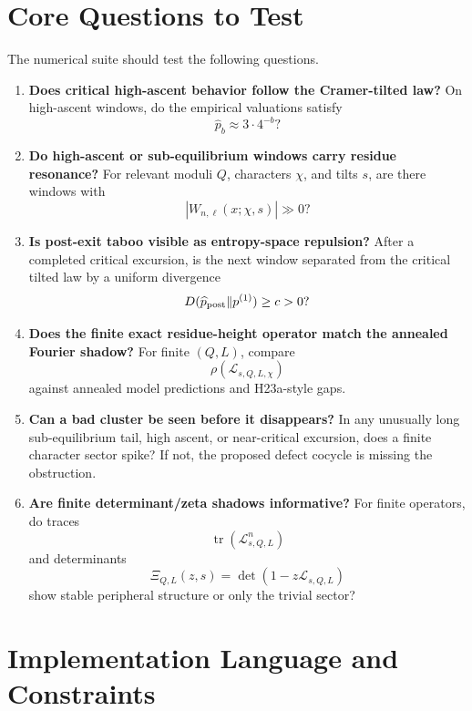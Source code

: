 \documentclass[11pt]{article}
\newcommand{\calL}{\mathcal L}
\begin{document}
\section{Core Questions to Test}

The numerical suite should test the following questions.

\begin{enumerate}[label=Q\arabic*.]
\item \textbf{Does critical high-ascent behavior follow the Cramer-tilted law?}  On high-ascent windows, do the empirical valuations satisfy
\[
        \widehat p_b \approx 3\cdot4^{-b}?
\]

\item \textbf{Do high-ascent or sub-equilibrium windows carry residue resonance?}  For relevant moduli \(Q\), characters \(\chi\), and tilts \(s\), are there windows with
\[
        |W_{n,\ell}(x;\chi,s)|\gg 0?
\]

\item \textbf{Is post-exit taboo visible as entropy-space repulsion?}  After a completed critical excursion, is the next window separated from the critical tilted law by a uniform divergence
\[
        D(\widehat p_{\rm post}\Vert p^{(1)})\ge c>0?
\]

\item \textbf{Does the finite exact residue-height operator match the annealed Fourier shadow?}  For finite \((Q,L)\), compare
\[
        \rho(\calL_{s,Q,L,\chi})
\]
against annealed model predictions and H23a-style gaps.

\item \textbf{Can a bad cluster be seen before it disappears?}  In any unusually long sub-equilibrium tail, high ascent, or near-critical excursion, does a finite character sector spike?  If not, the proposed defect cocycle is missing the obstruction.

\item \textbf{Are finite determinant/zeta shadows informative?}  For finite operators, do traces
\[
        \operatorname{tr}(\calL_{s,Q,L}^n)
\]
and determinants
\[
        \Xi_{Q,L}(z,s)=\det(1-z\calL_{s,Q,L})
\]
show stable peripheral structure or only the trivial sector?
\end{enumerate}

\section{Implementation Language and Constraints}
\end{document}
